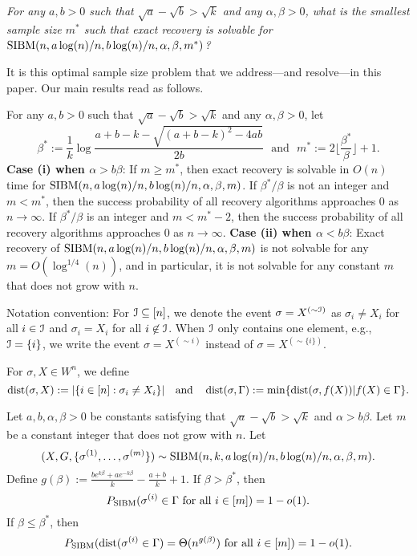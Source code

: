 \documentclass{article}
\begin{document}
\vspace*{.1in}
 \emph{For any $a,b> 0$ such that $\sqrt{a}-\sqrt{b}> \sqrt{k}$ and any $\alpha,\beta>0$, what is the smallest sample size $m^\ast$ such that exact recovery is solvable for $\operatorname{SIBM}(n,a\log(n)/n, b\log(n)/n,\alpha,\beta,m^\ast)$?}

\vspace*{.1in}  It is this optimal sample size problem that we address---and resolve---in this paper. 
Our main results read as follows.

\begin{theorem} \label{thm:wt1}
For any $a,b> 0$ such that $\sqrt{a}-\sqrt{b}> \sqrt{k}$ and any $\alpha,\beta>0$, let
\begin{equation} \label{eq:defstar}
\beta^\ast := \frac{1}{k}
\log\frac{a+b-k-\sqrt{(a+b-k)^2-4ab}}{2 b} \text{~~and~~}
m^\ast := 2 \Big\lfloor \frac{\beta^\ast}{\beta} \Big\rfloor +1 .
\end{equation}
{\bf Case (i) when $\alpha>b\beta$}: If $m\ge m^\ast$, then exact recovery is solvable in $O(n)$ time for $\SIBM(n,a\log(n)/n, \linebreak[4] b\log(n)/n,\alpha,\beta,m)$.
If $\beta^\ast/\beta$ is not an integer and $m<m^\ast$, then the success probability of all recovery algorithms approaches $0$ as $n\to\infty$. If $\beta^\ast/\beta$ is an integer and $m<m^\ast-2$, then the success probability of all recovery algorithms approaches $0$ as $n\to\infty$.
{\bf Case (ii) when $\alpha<b\beta$}: Exact recovery of $\operatorname{SIBM}(n,a\log(n)/n, b\log(n)/n,\alpha,\beta,m)$ is not solvable for any $m=O(\log^{1/4}(n))$, and in particular, it is not solvable for any constant $m$ that does not grow with $n$.
\end{theorem}

Notation convention:
For $\mathcal{I} \subseteq [n]$, we denote the event $\sigma = X^{(\sim \mathcal{I})}$ as $\sigma_i \neq X_i$ for all $i \in \mathcal{I}$ and $\sigma_i = X_i$ for all $i \not\in \mathcal{I}$.
When $\mathcal{I}$ only contains one element, e.g., $\mathcal{I}=\{i\}$, we write the event $\sigma = X^{(\sim i)}$ instead of $\sigma = X^{(\sim\{i\})}$.

For $\sigma,X\in W^n$, we define
$$
\operatorname{dist}(\sigma, X)
:=|\{i\in[n]:\sigma_i\neq X_i\}| 
\quad \text{and} \quad
\operatorname{dist}(\sigma,\Gamma)
:=\min\{\operatorname{dist}(\sigma, f(X)) | f(X) \in \Gamma\} .
$$
\begin{theorem}  \label{thm:wt3}
Let $a,b,\alpha,\beta> 0$ be constants satisfying that $\sqrt{a}-\sqrt{b} > \sqrt{k}$ and $\alpha>b\beta$. Let $m$ be a constant integer that does not grow with $n$.
Let 
$$
(X,G,\{\sigma^{(1)},\dots,\sigma^{(m)}\}) \sim \operatorname{SIBM}(n,k, a\log(n)/n, b\log(n)/n,\alpha,\beta,m).
$$
Define $g(\beta)  := \frac{b e^{k\beta}+a e^{-k\beta}}{k}-\frac{a+b}{k}+1$.
If $\beta>\beta^\ast$, then
$$
P_{\operatorname{SIBM}}(\sigma^{(i)} \in \Gamma \text{~for all~} i\in[m]) = 1-o(1).
$$
If $\beta\le \beta^\ast$, then
$$
P_{\operatorname{SIBM}}(\operatorname{dist}(\sigma^{(i)} \in \Gamma)= \Theta(n^{g(\beta)}) \text{~for all~} i\in[m]) = 1-o(1) .
$$
\end{theorem}
\end{document}
